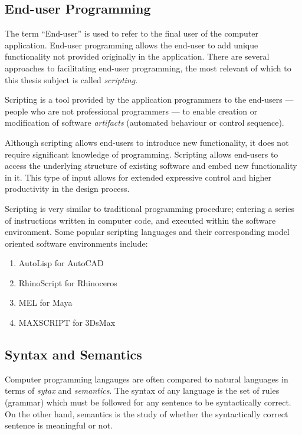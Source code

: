 \subsection{End-user Programming}
\label{sec:EndUserProgramming}

The term ``End-user'' is used to refer to the final user of the computer application. End-user programming  allows the end-user to add unique functionality not provided originally in the application. There are several approaches to facilitating end-user programming, the most relevant of which to this thesis subject is called \emph{scripting}.

Scripting is a tool provided by the application programmers to the end-users --- people who are not professional programmers --- to enable creation or modification of software \emph{artifacts} (automated behaviour or control sequence).

Although scripting allows end-users to introduce new functionality, it does not require significant knowledge of programming. Scripting allows end-users to access the underlying structure of existing software and embed new functionality in it. This type of input allows for extended expressive control and higher productivity in the design process. \cite{kashyap01}

Scripting is very similar to traditional programming procedure; entering a series of instructions written in computer code, and executed within the software environment. Some popular scripting languages and their corresponding model oriented software environments include: 

\vspace{-0.5cm}
\begin{enumerate}
\item AutoLisp for AutoCAD
\item RhinoScript for Rhinoceros
\item MEL for Maya
\item MAXSCRIPT for 3DsMax
\end{enumerate}

\subsection{Syntax and Semantics}

Computer programming langauges are often compared to natural languages in terms of \emph{sytax} and \emph{semantics}. The syntax of any language is the set of rules (grammar) which must be followed for any sentence to be syntactically correct. On the other hand, semantics is the study of whether the syntactically correct sentence is meaningful or not.

